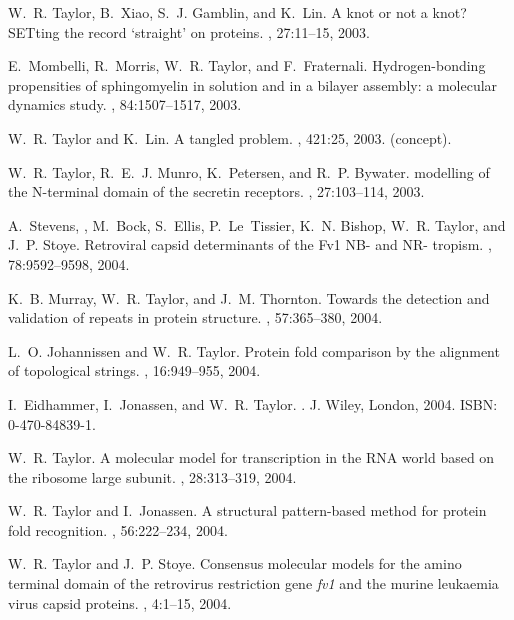\begin{thebibliography}{100}
W.~R. Taylor, B.~Xiao, S.~J. Gamblin, and K.~Lin.
\newblock A knot or not a knot? {SET}ting the record `straight' on proteins.
, 27:11--15, 2003.

E.~Mombelli, R.~Morris, W.~R. Taylor, and F.~Fraternali.
\newblock Hydrogen-bonding propensities of sphingomyelin in solution and in a
  bilayer assembly: a molecular dynamics study.
, 84:1507--1517, 2003.

W.~R. Taylor and K.~Lin.
\newblock A tangled problem.
, 421:25, 2003.
\newblock (concept).

W.~R. Taylor, R.~E.~J. Munro, K.~Petersen, and R.~P. Bywater.
 modelling of the {N}-terminal domain of the secretin
  receptors.
, 27:103--114, 2003.

A.~Stevens, , M.~Bock, S.~Ellis, P.~Le~Tissier, K.~N. Bishop, W.~R. Taylor, and
  J.~P. Stoye.
\newblock Retroviral capsid determinants of the {Fv1 NB-} and {NR-} tropism.
, 78:9592--9598, 2004.

K.~B. Murray, W.~R. Taylor, and J.~M. Thornton.
\newblock Towards the detection and validation of repeats in protein structure.
, 57:365--380, 2004.

L.~O. Johannissen and W.~R. Taylor.
\newblock Protein fold comparison by the alignment of topological strings.
, 16:949--955, 2004.

I.~Eidhammer, I.~Jonassen, and W.~R. Taylor.
.
\newblock J. Wiley, London, 2004.
\newblock ISBN: 0-470-84839-1.

W.~R. Taylor.
\newblock A molecular model for transcription in the {RNA} world based on the
  ribosome large subunit.
, 28:313--319, 2004.

W.~R. Taylor and I.~Jonassen.
\newblock A structural pattern-based method for protein fold recognition.
, 56:222--234, 2004.

W.~R. Taylor and J.~P. Stoye.
\newblock Consensus molecular models for the amino terminal domain of the
  retrovirus restriction gene {\em fv1} and the murine leukaemia virus capsid
  proteins.
, 4:1--15, 2004.


\end{thebibliography}

